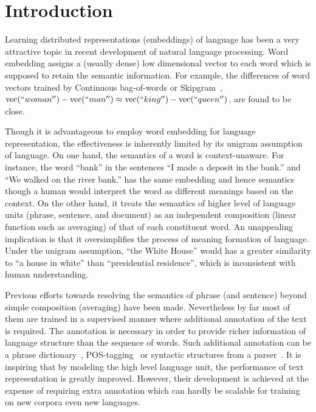 \section{Introduction}

Learning distributed representations (embeddings) of language has been a very
attractive topic in recent development of natural language processing. Word
embedding assigns a (usually dense) low dimensional vector to each word which is
supposed to retain the semantic information. For example, the differences of
word vectors trained by Continuous bag-of-words or
Skipgram~\cite{mikolov2013distributed}, $\text{vec}(``woman'') -
\text{vec}(``man'') \approx \text{vec}(``king'') - \text{vec}(``queen'')$, are
found to be close.

Though it is advantageous to employ word embedding for language representation,
the effectiveness is inherently limited by its unigram assumption of language.
On one hand, the semantics of a word is context-unaware. For instance, the word
``bank'' in the sentences ``I made a deposit in the bank.'' and ``We walked on
the river bank.'' has the same embedding and hence semantics though a human
would interpret the word as different meanings based on the context. On the
other hand, it treats the semantics of higher level of language units (phrase,
sentence, and document) as an independent composition (linear function such as
averaging) of that of each constituent word. An unappealing implication is that
it oversimplifies the process of meaning formation of language. Under the
unigram assumption, ``the White House'' would has a greater similarity to ``a
house in white'' than ``presidential residence'', which is inconsistent with
human understanding.

Previous efforts towards resolving the semantics of phrase (and sentence) beyond
simple composition (averaging) have been made. Nevertheless by far most of them
are trained in a supervised manner where additional annotation of the text is
required. The annotation is necessary in order to provide richer information of
language structure than the sequence of words. Such additional annotation can be
a phrase dictionary~\cite{yin2014exploration},
POS-tagging~\cite{zhao2015phrase,baroni2010nouns} or syntactic structures from a
parser~\cite{levy2014dependency,yu2015learning,socher2013parsing,
le2015compositional,irsoy2014deep}. It is inspiring that by modeling the high
level language unit, the performance of text representation is greatly improved.
However, their development is achieved at the expense of requiring extra
annotation which can hardly be scalable for training on new corpora even new
languages.

